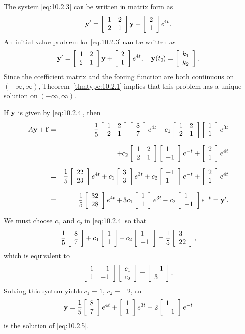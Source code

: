 \begin{examplesolution}
 The system \eqref{eq:10.2.3} can be written in matrix form as
\[
  {\bf y}'=\twobytwo1221{\bf y}+\twocol21e^{4t}.
\]
An initial value problem for \eqref{eq:10.2.3} can be written as
\[
  {\bf y}'=\twobytwo1221{\bf y}+\twocol21e^{4t},\quad {\bf y}(t_{0})=\twocol{k_{1}}{k_{2}}.
\]
Since the coefficient matrix and the forcing function are both continuous on $(-\infty,\infty)$,
Theorem~\ref{thmtype:10.2.1} implies that this problem has a unique solution on $(-\infty,\infty)$.

 If ${\bf y}$ is given by \eqref{eq:10.2.4}, then
\begin{eqnarray*}
  A{\bf y}+{\bf f} & = & \frac{1}{5}\twobytwo1221\twocol87e^{4t}+c_{1}\twobytwo1221\twocol11e^{3t}                     \\[2\jot]
                   &   & +c_{2}\twobytwo1221\twocol1{-1}e^{-t}+\twocol21e^{4t}                                         \\[2\jot]
                   & = & \frac{1}{5}\twocol{22}{23}e^{4t}+c_{1}\twocol33e^{3t}+c_{2}\twocol{-1}1e^{-t}+\twocol21e^{4t} \\[2\jot]
                   & = & \frac{1}{5}\twocol{32}{28}e^{4t}+3c_{1}\twocol11e^{3t}-c_{2}\twocol1{-1}e^{-t}={\bf y}'.
\end{eqnarray*}

 We must choose $c_{1}$ and $c_{2}$ in \eqref{eq:10.2.4} so that
\[
  \frac{1}{5}\twocol87+c_{1}\twocol11+c_{2}\twocol1{-1}=\frac{1}{5}\twocol3{22},
\]
which is equivalent to
\[
  \twobytwo111{-1}\twocol{c_{1}}{c_{2}}=\twocol{-1}3.
\]
Solving this system yields $c_{1}=1$, $c_{2}=-2$, so
\[
  {\bf y}=\frac{1}{5}\twocol87e^{4t}+\twocol11e^{3t}-2\twocol1{-1}e^{-t}
\]
is the solution of \eqref{eq:10.2.5}.
\end{examplesolution}

\color{blue}
\color{black}

\exercises

